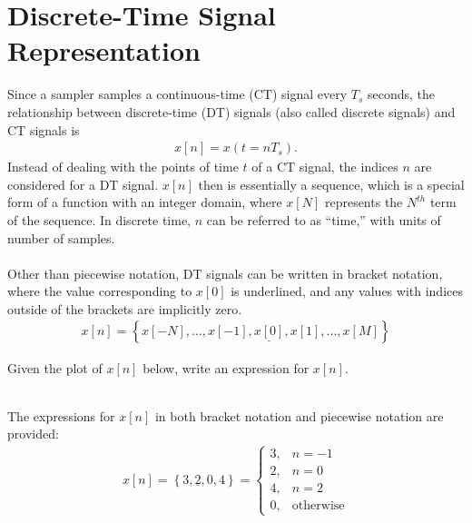 \documentclass{report}
\begin{document}
\section{Discrete-Time Signal Representation}
Since a sampler samples a continuous-time (CT) signal every $T_s$ seconds, the relationship between discrete-time (DT) signals (also called discrete signals) and CT signals is 
\begin{align}
    x[n] = x(t=nT_s).
\end{align}
Instead of dealing with the points of time $t$ of a CT signal, the indices $n$ are considered for a DT signal. $x[n]$ then is essentially a sequence, which is a special form of a function 
with an integer domain, where $x[N]$ represents the $N^{th}$ term of the sequence. In discrete time, $n$ can be referred to as ``time,'' with units of number of samples.
\\ \\
Other than piecewise notation, DT signals can be written in bracket notation, where the value corresponding to $x[0]$ is underlined, and any values with indices outside of the brackets are implicitly zero. 
\begin{align}
    x[n] = \left\{x[-N], ..., x[-1],\underline{x[0]}, x[1], ..., x[M]\right\}
\end{align}

\begin{example}
    Given the plot of $x[n]$ below, write an expression for $x[n]$. \\ \\
\end{example}
\begin{solution}
    The expressions for $x[n]$ in both bracket notation and piecewise notation are provided:
    \begin{align*}
        x[n] = \left\{3,\underline{2},0,4\right\} = 
        \begin{cases}
            3, & n=-1 \\
            2, & n=0 \\
            4, & n=2 \\
            0, & \text{otherwise}
        \end{cases}
    \end{align*}
\end{solution}
\end{document}
